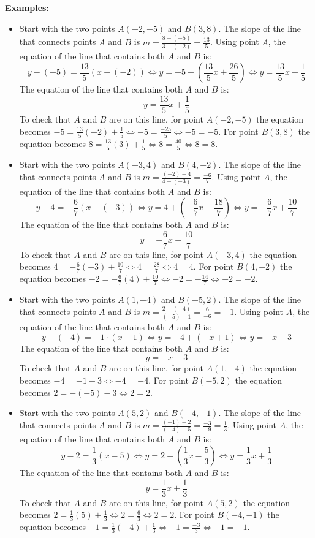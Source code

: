 \documentclass{article}
\begin{document}
\textbf{Examples:}
\begin{itemize}
\item Start with the two points \(A(-2, -5)\) and \(B(3, 8)\). The slope of the line that connects points \(A\) and \(B\) is \(m = \frac{8 - (-5)}{3 - (-2)} = \frac{13}{5}\). Using point \(A\), the equation of the line that contains both \(A\) and \(B\) is: 
\[y - (-5) = \frac{13}{5}(x - (-2)) \iff y = -5 + (\frac{13}{5}x + \frac{26}{5}) \iff y = \frac{13}{5}x + \frac{1}{5}\]
The equation of the line that contains both \(A\) and \(B\) is:
\[y = \frac{13}{5}x + \frac{1}{5}\]
To check that \(A\) and \(B\) are on this line, for point \(A(-2, -5)\) the equation becomes \(-5 = \frac{13}{5}(-2) + \frac{1}{5} \iff -5 = \frac{-25}{5} \iff -5 = -5\). For point \(B(3, 8)\) the equation becomes \(8 = \frac{13}{5}(3) + \frac{1}{5} \iff 8 = \frac{40}{5} \iff 8 = 8\).
\item Start with the two points \(A(-3,4)\) and \(B(4,-2)\). The slope of the line that connects points \(A\) and \(B\) is \(m = \frac{(-2) - 4}{4 - (-3)} = \frac{-6}{7}\). Using point \(A\), the equation of the line that contains both \(A\) and \(B\) is: 
\[y - 4 = -\frac{6}{7}(x - (-3)) \iff y = 4 + (-\frac{6}{7}x - \frac{18}{7}) \iff y = -\frac{6}{7}x + \frac{10}{7}\]
The equation of the line that contains both \(A\) and \(B\) is:
\[y = -\frac{6}{7}x + \frac{10}{7}\]
To check that \(A\) and \(B\) are on this line, for point \(A(-3, 4)\) the equation becomes \(4 = -\frac{6}{7}(-3) + \frac{10}{7} \iff 4 = \frac{28}{7} \iff 4 = 4\). For point \(B(4, -2)\) the equation becomes \(-2 = -\frac{6}{7}(4) + \frac{10}{7} \iff -2 = -\frac{14}{7} \iff -2 = -2\).
\item Start with the two points \(A(1,-4)\) and \(B(-5,2)\). The slope of the line that connects points \(A\) and \(B\) is \(m = \frac{2 - (-4)}{(-5) - 1} = \frac{6}{-6} = -1\). Using point \(A\), the equation of the line that contains both \(A\) and \(B\) is: 
\[y - (-4) = -1 \cdot (x - 1) \iff y = -4 + (-x + 1) \iff y = -x - 3\]
The equation of the line that contains both \(A\) and \(B\) is:
\[y = -x - 3\]
To check that \(A\) and \(B\) are on this line, for point \(A(1,-4)\) the equation becomes \(-4 = -1 - 3 \iff -4 = -4\). For point \(B(-5,2)\) the equation becomes \(2 = -(-5) - 3 \iff 2 = 2\).
\item Start with the two points \(A(5,2)\) and \(B(-4,-1)\). The slope of the line that connects points \(A\) and \(B\) is \(m = \frac{(-1) - 2}{(-4) - 5} = \frac{-3}{-9} = \frac{1}{3}\). Using point \(A\), the equation of the line that contains both \(A\) and \(B\) is: 
\[y - 2 = \frac{1}{3}(x - 5) \iff y = 2 + (\frac{1}{3}x - \frac{5}{3}) \iff y = \frac{1}{3}x + \frac{1}{3}\]
The equation of the line that contains both \(A\) and \(B\) is:
\[y = \frac{1}{3}x + \frac{1}{3}\]
To check that \(A\) and \(B\) are on this line, for point \(A(5,2)\) the equation becomes \(2 = \frac{1}{3}(5) + \frac{1}{3} \iff 2 = \frac{6}{3} \iff 2 = 2\). For point \(B(-4,-1)\) the equation becomes \(-1 = \frac{1}{3}(-4) + \frac{1}{3} \iff -1 = \frac{-3}{3} \iff -1 = -1\).
\end{itemize}
\end{document}
